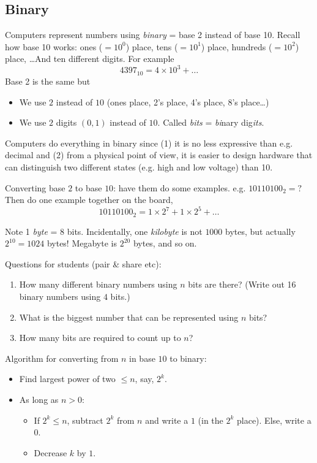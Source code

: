 \documentclass{article}
\begin{document}
\subsection*{Binary}

Computers represent numbers using \emph{binary} = base 2 instead of
base 10.  Recall how base 10 works: ones ($=10^0$) place, tens
($=10^1$) place, hundreds ($=10^2$) place, \dots  And ten different
digits.  For example \[ 4397_{10} = 4 \times 10^3 + \dots \] Base 2 is
the same but
\begin{itemize}
\item We use $2$ instead of $10$ (ones place, 2's place, 4's place,
  8's place\dots)
\item We use $2$ digits $(0,1)$ instead of $10$.  Called \emph{bits} =
  \emph{bi}nary dig\emph{its}.
\end{itemize}
Computers do everything in binary since (1) it is no less expressive
than e.g. decimal and (2) from a physical point of view, it is easier
to design hardware that can distinguish two different states
(e.g. high and low voltage) than 10.

Converting base $2$ to base $10$: have them do some
examples. e.g. $10110100_2 = ?$  Then do one example together on the
board, \[ 10110100_2 = 1 \times 2^7 + 1 \times 2^5 + \dots \]

Note 1 \emph{byte} = 8 bits.  Incidentally, one \emph{kilobyte} is not
$1000$ bytes, but actually $2^{10} = 1024$ bytes!  Megabyte is
$2^{20}$ bytes, and so on.

Questions for students (pair \& share etc):
\begin{enumerate}
\item How many different binary numbers using $n$ bits are there?
  (Write out 16 binary numbers using $4$ bits.)
\item What is the biggest number that can be represented using $n$
  bits?
\item How many bits are required to count up to $n$?
\end{enumerate}

Algorithm for converting from $n$ in base $10$ to binary:
\begin{itemize}
\item Find largest power of two $\leq n$, say, $2^k$.
\item As long as $n > 0$:
  \begin{itemize}
  \item If $2^k \leq n$, subtract $2^k$ from $n$ and write a $1$
    (in the $2^k$ place). Else, write a $0$.
  \item Decrease $k$ by $1$.
  \end{itemize}
\end{itemize}
\end{document}
